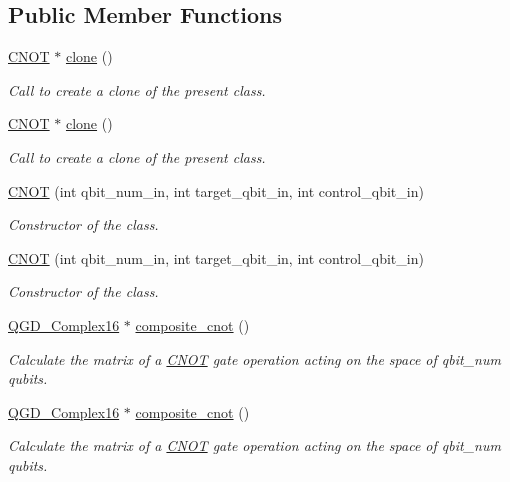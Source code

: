 \subsection*{Public Member Functions}
\begin{DoxyCompactItemize}
\item 
\hyperlink{class_c_n_o_t}{C\+N\+OT} $\ast$ \hyperlink{class_c_n_o_t_adaf82830347d53a38f83cc7d993f923f}{clone} ()
\begin{DoxyCompactList}\small\item\em Call to create a clone of the present class. \end{DoxyCompactList}\item 
\hyperlink{class_c_n_o_t}{C\+N\+OT} $\ast$ \hyperlink{class_c_n_o_t_ae5677074931b985f239441a96697d300}{clone} ()
\begin{DoxyCompactList}\small\item\em Call to create a clone of the present class. \end{DoxyCompactList}\item 
\hyperlink{class_c_n_o_t_a9e46511d49d6dc36e04bbd945d3483e4}{C\+N\+OT} (int qbit\+\_\+num\+\_\+in, int target\+\_\+qbit\+\_\+in, int control\+\_\+qbit\+\_\+in)
\begin{DoxyCompactList}\small\item\em Constructor of the class. \end{DoxyCompactList}\item 
\hyperlink{class_c_n_o_t_a9e46511d49d6dc36e04bbd945d3483e4}{C\+N\+OT} (int qbit\+\_\+num\+\_\+in, int target\+\_\+qbit\+\_\+in, int control\+\_\+qbit\+\_\+in)
\begin{DoxyCompactList}\small\item\em Constructor of the class. \end{DoxyCompactList}\item 
\hyperlink{struct_q_g_d___complex16}{Q\+G\+D\+\_\+\+Complex16} $\ast$ \hyperlink{class_c_n_o_t_ab664b7c42e2bd92b818bb2e4aa1aaa4b}{composite\+\_\+cnot} ()
\begin{DoxyCompactList}\small\item\em Calculate the matrix of a \hyperlink{class_c_n_o_t}{C\+N\+OT} gate operation acting on the space of qbit\+\_\+num qubits. \end{DoxyCompactList}\item 
\hyperlink{struct_q_g_d___complex16}{Q\+G\+D\+\_\+\+Complex16} $\ast$ \hyperlink{class_c_n_o_t_ad5caf96890e39fb6b7a8c7524fe324b4}{composite\+\_\+cnot} ()
\begin{DoxyCompactList}\small\item\em Calculate the matrix of a \hyperlink{class_c_n_o_t}{C\+N\+OT} gate operation acting on the space of qbit\+\_\+num qubits. \end{DoxyCompactList}\item 

\end{DoxyCompactItemize}
